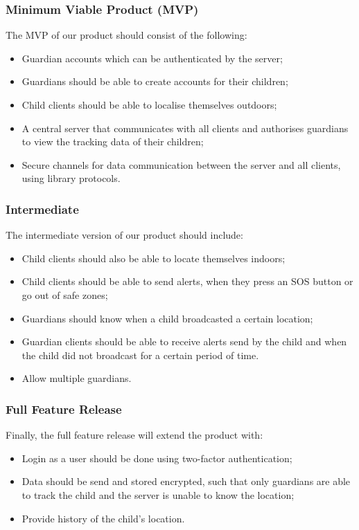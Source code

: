 \documentclass[a4paper]{article}
\begin{document}
\subsubsection{Minimum Viable Product (MVP)}
The MVP of our product should consist of the following:
\begin{itemize}
    \item Guardian accounts which can be authenticated by the server;
    \item Guardians should be able to create accounts for their children;
    \item Child clients should be able to localise themselves outdoors;
    \item A central server that communicates with all clients and authorises guardians to view the
        tracking data of their children;
    \item Secure channels for data communication between the server and all clients, using library
        protocols.
\end{itemize}

\subsubsection{Intermediate}
The intermediate version of our product should include:
\begin{itemize}
    \item Child clients should also be able to locate themselves indoors;
    \item Child clients should be able to send alerts, when they press an SOS button or go out of
        safe zones;
    \item Guardians should know when a child broadcasted a certain location;
    \item Guardian clients should be able to receive alerts send by the child and when the child did
        not broadcast for a certain period of time.
    \item Allow multiple guardians.
\end{itemize}

\subsubsection{Full Feature Release}
Finally, the full feature release will extend the product with:
\begin{itemize}
    \item Login as a user should be done using two-factor authentication;
    \item Data should be send and stored encrypted, such that only guardians are able to track the
        child and the server is unable to know the location;
    \item Provide history of the child's location.
\end{itemize}
\end{document}
